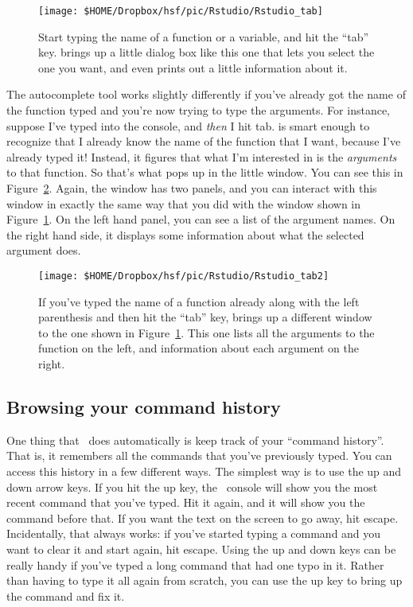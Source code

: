 \begin{figure}[t]
\begin{center}
		\texttt{[image: \$HOME/Dropbox/hsf/pic/Rstudio/Rstudio\_tab]}
\caption{Start typing the name of a function or a variable, and hit the ``tab'' key. \Rstudio brings up a little dialog box like this one that lets you select the one you want, and even prints out a little information about it.}
\label{fig:Rstudiotab}
\end{center}
\end{figure}

The \Rstudio autocomplete tool works slightly differently if you've already got the name of the function typed and you're now trying to type the arguments. For instance, suppose I've typed  into the console, and {\it then} I hit tab. \Rstudio is smart enough to recognize that I already know the name of the function that I want, because I've already typed it! Instead, it figures that what I'm interested in is the {\it arguments} to that function. So that's what pops up in the little window. You can see this in Figure~\ref{fig:Rstudiotab2}. Again, the window has two panels, and you can interact with this window in exactly the same way that you did with the window shown in Figure~\ref{fig:Rstudiotab}. On the left hand panel, you can see a list of the argument names. On the right hand side, it displays some information about what the selected argument does. 


\begin{figure}[t]
\begin{center}
		\texttt{[image: \$HOME/Dropbox/hsf/pic/Rstudio/Rstudio\_tab2]}
\caption{If you've typed the name of a function already along with the left parenthesis and then hit the ``tab'' key, \Rstudio brings up a different window to the one shown in Figure~\protect\ref{fig:Rstudiotab}. This one lists all the arguments to the function on the left, and information about each argument on the right.}
\label{fig:Rstudiotab2}
\end{center}
\end{figure}


\subsection{Browsing your command history}

One thing that \R\ does automatically is keep track of your ``command history''. That is, it remembers all the commands that you've previously typed. You can access this history in a few different ways. The simplest way is to use the up and down arrow keys. If you hit the up key, the \R\ console will show you the most recent command that you've typed. Hit it again, and it will show you the command before that. If you want the text on the screen to go away, hit escape. Incidentally, that always works: if you've started typing a command and you want to clear it and start again, hit escape. Using the up and down keys can be really handy if you've typed a long command that had one typo in it. Rather than having to type it all again from scratch, you can use the up key to bring up the command and fix it. 

